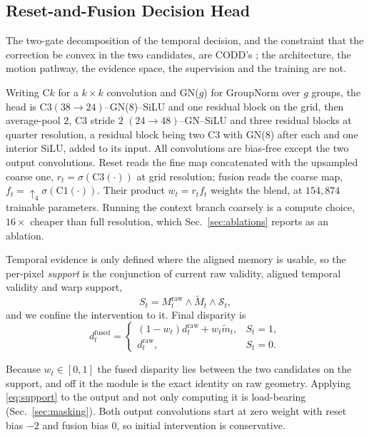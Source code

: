 \documentclass[letterpaper,10pt,conference]{ieeeconf}
\newcommand{\raw}{\mathrm{raw}}
\newcommand{\fused}{\mathrm{fused}}
\begin{document}
\subsection{Reset-and-Fusion Decision Head}

The two-gate decomposition of the temporal decision, and the constraint that
the correction be convex in the two candidates, are CODD's
\cite{li2023codd}; the architecture, the motion pathway, the evidence space,
the supervision and the training are not.

Writing $\mathrm{C}k$ for a $k\times k$ convolution and GN($g$) for GroupNorm
over $g$ groups, the head is $\mathrm{C}3(38{\to}24)$--GN($8$)--SiLU and one
residual block on the grid, then average-pool $2$, $\mathrm{C}3$ stride $2$ $(24{\to}48)$--GN--SiLU
and three residual blocks at quarter resolution, a residual block being two $\mathrm{C}3$ with
GN($8$) after each and one interior SiLU, added to its input. All convolutions
are bias-free except the two output convolutions.
Reset reads the fine map concatenated with the upsampled coarse one,
$r_t=\sigma(\mathrm{C}3(\cdot))$ at grid resolution; fusion reads the coarse
map, $f_t=\uparrow_4\sigma(\mathrm{C}1(\cdot))$. Their product $w_t=r_tf_t$
weights the blend, at $154{,}874$ trainable parameters. Running the context
branch coarsely is a compute choice, $16\times$ cheaper than full resolution,
which Sec.~\ref{sec:ablations} reports as an ablation.

Temporal evidence is only defined where the aligned memory is usable, so
the per-pixel \emph{support} is the conjunction of current raw validity,
aligned temporal validity and warp support,
%
\begin{equation}
S_t = M_t^{\raw} \wedge \widetilde M_t \wedge \mathcal{S}_t ,
\label{eq:support}
\end{equation}
%
and we confine the intervention to it. Final disparity is
%
\begin{equation}
\boxed{
d_t^{\fused}
=
\begin{cases}
(1-w_t)d_t^{\raw}+w_t\widetilde m_t, & S_t=1,\\[2pt]
d_t^{\raw}, & S_t=0.
\end{cases}
}
\label{eq:fusion}
\end{equation}

Because $w_t\in[0,1]$ the fused disparity lies between the two candidates on
the support, and off it the module is the exact identity on raw geometry.
Applying \eqref{eq:support} to the output and not only computing it is
load-bearing (Sec.~\ref{sec:masking}). Both output convolutions start at zero
weight with reset bias $-2$ and fusion bias $0$, so initial intervention is
conservative.
\end{document}
